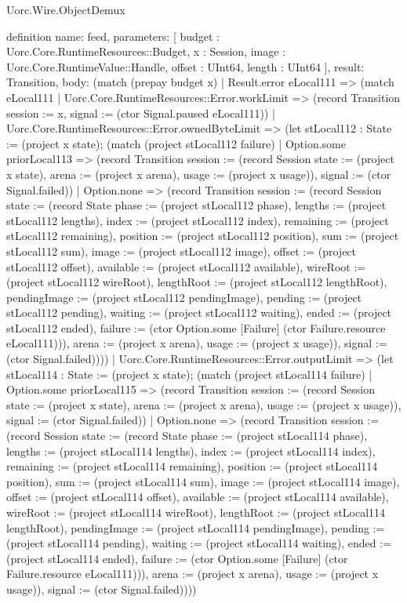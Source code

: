 \begin{lexlean}{Uorc.Wire.ObjectDemux}
\begin{semanticmodule}
definition{
  name: feed,
  parameters: [
    budget : Uorc.Core.RuntimeResources::Budget,
    x : Session,
    image : Uorc.Core.RuntimeValue::Handle,
    offset : UInt64,
    length : UInt64
  ],
  result: Transition,
  body: (match (prepay budget x)
    | Result.error eLocal111 => (match eLocal111
      | Uorc.Core.RuntimeResources::Error.workLimit => (record Transition {session := x, signal := (ctor Signal.paused eLocal111)})
      | Uorc.Core.RuntimeResources::Error.ownedByteLimit => (let stLocal112 : State := (project x state); (match (project stLocal112 failure)
        | Option.some priorLocal113 => (record Transition {session := (record Session {state := (project x state), arena := (project x arena), usage := (project x usage)}), signal := (ctor Signal.failed)})
        | Option.none => (record Transition {session := (record Session {state := (record State {phase := (project stLocal112 phase), lengths := (project stLocal112 lengths), index := (project stLocal112 index), remaining := (project stLocal112 remaining), position := (project stLocal112 position), sum := (project stLocal112 sum), image := (project stLocal112 image), offset := (project stLocal112 offset), available := (project stLocal112 available), wireRoot := (project stLocal112 wireRoot), lengthRoot := (project stLocal112 lengthRoot), pendingImage := (project stLocal112 pendingImage), pending := (project stLocal112 pending), waiting := (project stLocal112 waiting), ended := (project stLocal112 ended), failure := (ctor Option.some [Failure] (ctor Failure.resource eLocal111))}), arena := (project x arena), usage := (project x usage)}), signal := (ctor Signal.failed)})))
      | Uorc.Core.RuntimeResources::Error.outputLimit => (let stLocal114 : State := (project x state); (match (project stLocal114 failure)
        | Option.some priorLocal115 => (record Transition {session := (record Session {state := (project x state), arena := (project x arena), usage := (project x usage)}), signal := (ctor Signal.failed)})
        | Option.none => (record Transition {session := (record Session {state := (record State {phase := (project stLocal114 phase), lengths := (project stLocal114 lengths), index := (project stLocal114 index), remaining := (project stLocal114 remaining), position := (project stLocal114 position), sum := (project stLocal114 sum), image := (project stLocal114 image), offset := (project stLocal114 offset), available := (project stLocal114 available), wireRoot := (project stLocal114 wireRoot), lengthRoot := (project stLocal114 lengthRoot), pendingImage := (project stLocal114 pendingImage), pending := (project stLocal114 pending), waiting := (project stLocal114 waiting), ended := (project stLocal114 ended), failure := (ctor Option.some [Failure] (ctor Failure.resource eLocal111))}), arena := (project x arena), usage := (project x usage)}), signal := (ctor Signal.failed)})))
}
\end{semanticmodule}
\end{lexlean}
